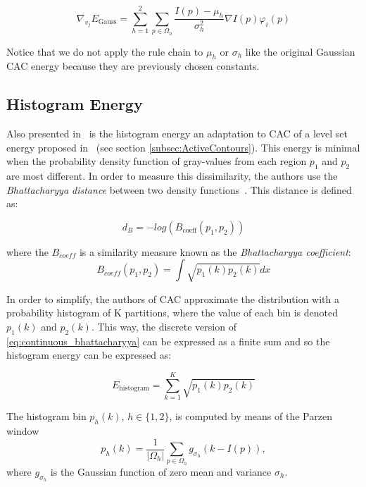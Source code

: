 \begin{equation}
	\nabla_{v_j} E_{\mathrm{Gauss}}  = \sum\limits_{h =1}^{2} \sum_{p \in \Omega_h} \frac{I(p)-\mu_h}{\sigma_h^2}\nabla I(p) \varphi_i(p)
\end{equation}

Notice that we do not apply the rule chain to $\mu_h$ or $\sigma_h$ like the original Gaussian CAC energy because they are previously chosen constants. 

\subsection{Histogram Energy}
\label{subsubsec:histogram_energy}

Also presented in~\cite{ipcac2015} is the histogram energy an adaptation to CAC of a level set energy proposed in~\cite{Michailovich2007} (see section \ref{subsec:ActiveContours}). This energy is minimal when the probability density function of gray-values from each region $p_1$ and $p_2$ are most different. In order to measure this dissimilarity, the authors use the \textit{Bhattacharyya distance} between two density functions~\cite{Cha07comprehensivesurvey}. This distance is defined as:

\begin{equation}
	d_B=-log(B_{\mathrm{coeff}}(p_1,p_2))
\end{equation}

where the $B_{coeff}$ is a similarity measure known as the \textit{Bhattacharyya coefficient}:
\begin{equation}\label{eq:continuous_bhattacharyya}
	B_{coeff}(p_1,p_2)=\int{\sqrt{p_1(k)p_2(k)}}dx
\end{equation}

In order to simplify, the authors of CAC approximate the distribution with a probability histogram of K partitions, where the value of each bin is denoted $p_1(k)$ and $p_2(k)$. This way, the discrete version of  \eqref{eq:continuous_bhattacharyya} can be expressed as a finite sum and so the histogram energy can be expressed as:

\begin{equation}\label{eq:discrete_bhattacharyya}
E_{\mathrm{histogram}} =\sum\limits_{k=1}^K\sqrt{p_1(k)p_2(k)}
\end{equation}

The histogram bin $p_h(k)$,
$h \in \{1,2\}$, is computed by means of the Parzen window~\cite{Michailovich2007}
\begin{equation}
\label{eq:bin_value}
p_h(k) = \frac{1}{|\Omega_h|} \sum_{p \in \Omega_h} g_{\sigma_h}(k-I(p)),
\end{equation}
where $g_{\sigma_h}$ is the Gaussian function of zero mean and variance $\sigma_h$.


